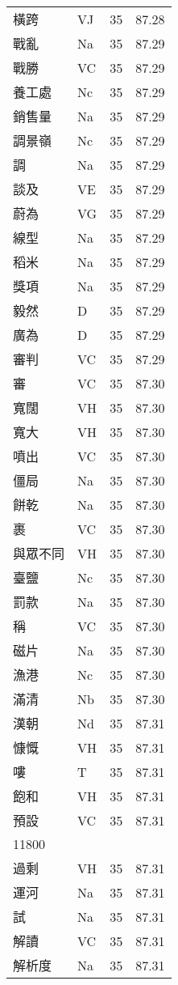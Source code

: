 \documentclass[twocolumn]{book}
\begin{document}
\begin{supertabular}{llrr}
橫跨 & VJ & 35 &  87.28\\
戰亂 & Na & 35 &  87.29\\
戰勝 & VC & 35 &  87.29\\
養工處 & Nc & 35 &  87.29\\
銷售量 & Na & 35 &  87.29\\
調景嶺 & Nc & 35 &  87.29\\
調 & Na & 35 &  87.29\\
談及 & VE & 35 &  87.29\\
蔚為 & VG & 35 &  87.29\\
線型 & Na & 35 &  87.29\\
稻米 & Na & 35 &  87.29\\
獎項 & Na & 35 &  87.29\\
毅然 & D & 35 &  87.29\\
廣為 & D & 35 &  87.29\\
審判 & VC & 35 &  87.29\\
審 & VC & 35 &  87.30\\
寬闊 & VH & 35 &  87.30\\
寬大 & VH & 35 &  87.30\\
噴出 & VC & 35 &  87.30\\
僵局 & Na & 35 &  87.30\\
餅乾 & Na & 35 &  87.30\\
裹 & VC & 35 &  87.30\\
與眾不同 & VH & 35 &  87.30\\
臺鹽 & Nc & 35 &  87.30\\
罰款 & Na & 35 &  87.30\\
稱 & VC & 35 &  87.30\\
磁片 & Na & 35 &  87.30\\
漁港 & Nc & 35 &  87.30\\
滿清 & Nb & 35 &  87.30\\
漢朝 & Nd & 35 &  87.31\\
慷慨 & VH & 35 &  87.31\\
嘍 & T & 35 &  87.31\\
飽和 & VH & 35 &  87.31\\
預設 & VC & 35 &  87.31\\
11800\\
過剩 & VH & 35 &  87.31\\
運河 & Na & 35 &  87.31\\
試 & Na & 35 &  87.31\\
解讀 & VC & 35 &  87.31\\
解析度 & Na & 35 &  87.31\\

\end{supertabular}
\end{document}
